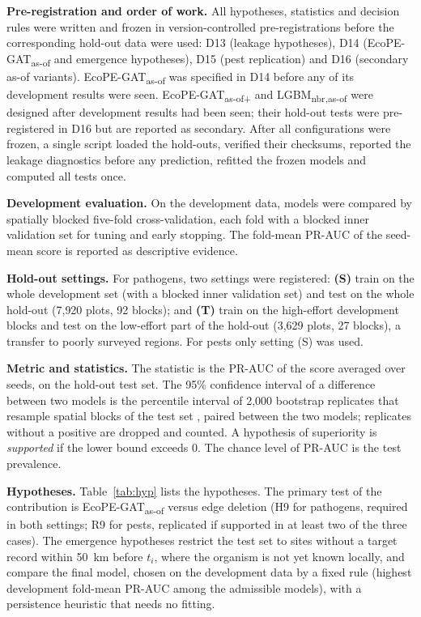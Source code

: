 \documentclass[a4paper,fleqn]{cas-sc}
\newcommand{\Masof}{\mbox{EcoPE-GAT\textsubscript{as-of}}}
\newcommand{\Masofplus}{\mbox{EcoPE-GAT\textsubscript{as-of+}}}
\newcommand{\Lasof}{\mbox{LGBM\textsubscript{nbr,as-of}}}
\begin{document}
\textbf{Pre-registration and order of work.} All hypotheses, statistics and decision rules were written and frozen in version-controlled pre-registrations before the corresponding hold-out data were used: D13 (leakage hypotheses), D14 (\Masof{} and emergence hypotheses), D15 (pest replication) and D16 (secondary as-of variants). \Masof{} was specified in D14 before any of its development results were seen. \Masofplus{} and \Lasof{} were designed after development results had been seen; their hold-out tests were pre-registered in D16 but are reported as secondary. After all configurations were frozen, a single script loaded the hold-outs, verified their checksums, reported the leakage diagnostics before any prediction, refitted the frozen models and computed all tests once.

\textbf{Development evaluation.} On the development data, models were compared by spatially blocked five-fold cross-validation, each fold with a blocked inner validation set for tuning and early stopping. The fold-mean PR-AUC of the seed-mean score is reported as descriptive evidence.

\textbf{Hold-out settings.} For pathogens, two settings were registered: \textbf{(S)} train on the whole development set (with a blocked inner validation set) and test on the whole hold-out (7{,}920 plots, 92 blocks); and \textbf{(T)} train on the high-effort development blocks and test on the low-effort part of the hold-out (3{,}629 plots, 27 blocks), a transfer to poorly surveyed regions. For pests only setting (S) was used.

\textbf{Metric and statistics.} The statistic is the PR-AUC of the score averaged over seeds, on the hold-out test set. The 95\% confidence interval of a difference between two models is the percentile interval of 2{,}000 bootstrap replicates that resample spatial blocks of the test set \citep{efron1979}, paired between the two models; replicates without a positive are dropped and counted. A hypothesis of superiority is \emph{supported} if the lower bound exceeds 0. The chance level of PR-AUC is the test prevalence.

\textbf{Hypotheses.} Table~\ref{tab:hyp} lists the hypotheses. The primary test of the contribution is \Masof{} versus edge deletion (H9 for pathogens, required in both settings; R9 for pests, replicated if supported in at least two of the three cases). The emergence hypotheses restrict the test set to sites without a target record within 50~km before $t_i$, where the organism is not yet known locally, and compare the final model, chosen on the development data by a fixed rule (highest development fold-mean PR-AUC among the admissible models), with a persistence heuristic that needs no fitting.
\end{document}
